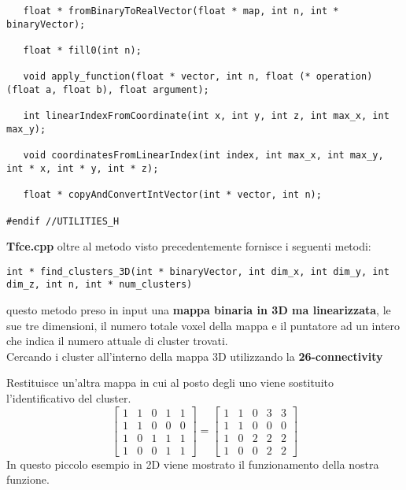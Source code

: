 \documentclass{beamer}
\begin{document}
\begin{frame}[fragile]
\begin{center}
\begin{lstlisting}
   float * fromBinaryToRealVector(float * map, int n, int * binaryVector);

   float * fill0(int n);

   void apply_function(float * vector, int n, float (* operation) (float a, float b), float argument);

   int linearIndexFromCoordinate(int x, int y, int z, int max_x, int max_y);

   void coordinatesFromLinearIndex(int index, int max_x, int max_y, int * x, int * y, int * z);

   float * copyAndConvertIntVector(int * vector, int n);
   
#endif //UTILITIES_H
\end{lstlisting}
\end{center}
\end{frame}

\begin{frame}[fragile]
\textbf{Tfce.cpp} oltre al metodo visto precedentemente fornisce i seguenti metodi:\\
\begin{lstlisting}
int * find_clusters_3D(int * binaryVector, int dim_x, int dim_y, int dim_z, int n, int * num_clusters)
\end{lstlisting}
questo metodo preso in input una \textbf{mappa binaria in 3D ma linearizzata}, le sue tre dimensioni, il numero totale voxel della mappa e il puntatore ad un intero che indica il numero attuale di cluster trovati.\\
\smallskip
Cercando i cluster all'interno della mappa 3D utilizzando la \textbf{26-connectivity}
\end{frame}

\begin{frame}
Restituisce un'altra mappa in cui al posto degli uno viene sostituito l'identificativo del cluster.
\[
\begin{bmatrix}
    1       & 1 & 0 & 1 & 1\\
    1       & 1 & 0 & 0 & 0 \\
    1       & 0 & 1 & 1 & 1 \\
    1       & 0 & 0 & 1 & 1
\end{bmatrix}
=
\begin{bmatrix}
    1       & 1 & 0 & 3 & 3\\
    1       & 1 & 0 & 0 & 0 \\
    1       & 0 & 2 & 2 & 2 \\
    1       & 0 & 0 & 2 & 2
\end{bmatrix}
\]
In questo piccolo esempio in 2D viene mostrato il funzionamento della nostra funzione.
\end{frame}
\end{document}
